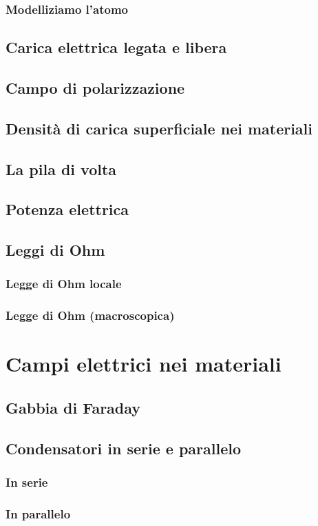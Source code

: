 \documentclass{book}
\begin{document}
\subsection{Modelliziamo l'atomo}
\section{Carica elettrica legata e libera}
\section{Campo di polarizzazione}
\section{Densit\`a di carica superficiale nei materiali}
\section{La pila di volta}
\section{Potenza elettrica}
\section{Leggi di Ohm}
\subsection{Legge di Ohm locale}
\subsection{Legge di Ohm (macroscopica)}

\chapter{Campi elettrici nei materiali}
\section{Gabbia di Faraday}
\section{Condensatori in serie e parallelo}
\subsection{In serie}
\subsection{In parallelo}
\end{document}
